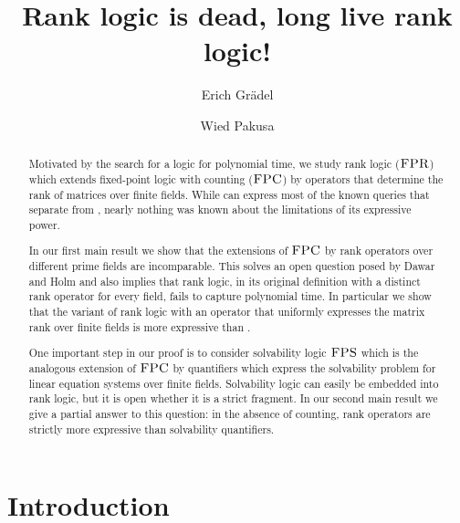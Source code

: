 \documentclass[a4paper,UKenglish]{lipics}
\title{Rank logic is dead, long live rank logic!}
\author{Erich Grädel}
\author{Wied Pakusa}
\affil{Mathematical Foundations of Computer Science, RWTH Aachen University\\
  \texttt{\{graedel,pakusa\}@logic.rwth-aachen.de}}
\newcommand{\logic}[1]{\ensuremath{\textsc{#1}}\xspace}
\newcommand{\FPC}{\logic{FPC}}
\newcommand{\FPRK}{\logic{FPR}}
\newcommand{\FPR}{\FPRK}
\newcommand{\FPS}{\ensuremath{\logic{FPS}}\xspace}
\theoremstyle{plain}
\begin{document}
\maketitle

\begin{abstract}
Motivated by the search for a logic for polynomial time, we study 
rank logic (\FPR) which extends fixed-point logic with counting 
(\FPC) by operators that determine the rank of matrices over finite fields.
While   can express most of the known queries that 
separate  from , nearly nothing was known about the limitations 
of its expressive power.

In our first main result we show that the extensions of \FPC by rank operators 
over different prime fields are incomparable. This 
solves an open question posed by Dawar and Holm and also implies that rank 
logic, in its original definition with a distinct rank operator for every 
field, 
fails to capture polynomial time.
In particular we show that the variant of rank logic  with an operator 
that uniformly expresses the matrix rank over finite fields is more expressive 
than .

One important step in our proof is to consider solvability logic \FPS which is 
the analogous extension of \FPC by quantifiers which express the solvability 
problem for linear equation systems over finite fields.
Solvability logic can easily be embedded into rank logic, but it is open 
whether it is a strict fragment.
In our second main result we give a partial answer to this question: 
in the absence of  counting, rank operators are strictly more expressive than 
solvability quantifiers.
\end{abstract}

\section{Introduction}
\end{document}
